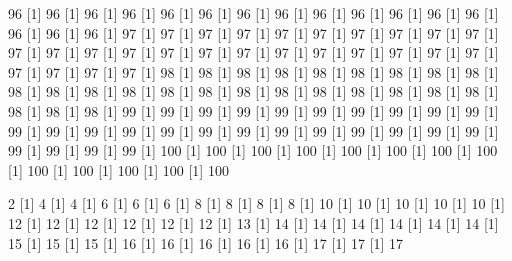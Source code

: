 \documentclass[12pt]{article}
\begin{document}
\begin{Schunk}
\begin{Soutput}
[1] 96%
[1] 96%
[1] 96%
[1] 96%
[1] 96%
[1] 96%
[1] 96%
[1] 96%
[1] 96%
[1] 96%
[1] 96%
[1] 96%
[1] 96%
[1] 96%
[1] 96%
[1] 96%
[1] 97%
[1] 97%
[1] 97%
[1] 97%
[1] 97%
[1] 97%
[1] 97%
[1] 97%
[1] 97%
[1] 97%
[1] 97%
[1] 97%
[1] 97%
[1] 97%
[1] 97%
[1] 97%
[1] 97%
[1] 97%
[1] 97%
[1] 97%
[1] 97%
[1] 97%
[1] 97%
[1] 97%
[1] 97%
[1] 97%
[1] 97%
[1] 98%
[1] 98%
[1] 98%
[1] 98%
[1] 98%
[1] 98%
[1] 98%
[1] 98%
[1] 98%
[1] 98%
[1] 98%
[1] 98%
[1] 98%
[1] 98%
[1] 98%
[1] 98%
[1] 98%
[1] 98%
[1] 98%
[1] 98%
[1] 98%
[1] 98%
[1] 98%
[1] 98%
[1] 98%
[1] 99%
[1] 99%
[1] 99%
[1] 99%
[1] 99%
[1] 99%
[1] 99%
[1] 99%
[1] 99%
[1] 99%
[1] 99%
[1] 99%
[1] 99%
[1] 99%
[1] 99%
[1] 99%
[1] 99%
[1] 99%
[1] 99%
[1] 99%
[1] 99%
[1] 99%
[1] 99%
[1] 99%
[1] 99%
[1] 99%
[1] 99%
[1] 100%
[1] 100%
[1] 100%
[1] 100%
[1] 100%
[1] 100%
[1] 100%
[1] 100%
[1] 100%
[1] 100%
[1] 100%
[1] 100%
[1] 100%
\end{Soutput}
\begin{Soutput}
[1] 2%
[1] 4%
[1] 4%
[1] 6%
[1] 6%
[1] 6%
[1] 8%
[1] 8%
[1] 8%
[1] 8%
[1] 10%
[1] 10%
[1] 10%
[1] 10%
[1] 10%
[1] 12%
[1] 12%
[1] 12%
[1] 12%
[1] 12%
[1] 12%
[1] 13%
[1] 14%
[1] 14%
[1] 14%
[1] 14%
[1] 14%
[1] 14%
[1] 15%
[1] 15%
[1] 15%
[1] 16%
[1] 16%
[1] 16%
[1] 16%
[1] 16%
[1] 17%
[1] 17%
[1] 17%

\end{Soutput}
\end{Schunk}
\end{document}
